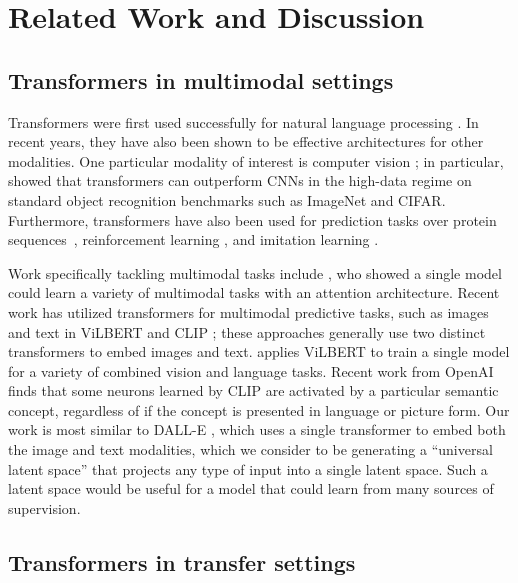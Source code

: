 
\section{Related Work and Discussion}
\label{sec:relatedwork}

\subsection{Transformers in multimodal settings}

Transformers \citep{vaswani2017attention} were first used successfully for natural language processing \citep{radford2018gpt, devlin2019bert, radford2019gpt2, brown2020gpt3}.
In recent years, they have also been shown to be effective architectures for other modalities.
One particular modality of interest is computer vision \citep{chen2020imagegpt, touvron2020deit}; in particular, \cite{dosovitskiy2020vit} showed that transformers can outperform CNNs in the high-data regime on standard object recognition benchmarks such as ImageNet and CIFAR.
Furthermore, transformers have also been used for prediction tasks over protein sequences~\citep{jumper2021alphafold, rao2021msa}, reinforcement learning \citep{parisotto2020stabilizing}, and imitation learning \citep{abramson2020imitating}.

Work specifically tackling multimodal tasks include \cite{kaiser2017multitask}, who showed a single model could learn a variety of multimodal tasks with an attention architecture.
Recent work has utilized transformers for multimodal predictive tasks, such as images and text in ViLBERT \citep{lu2019vilbert} and CLIP \citep{radford2021clip}; these approaches generally use two distinct transformers to embed images and text.
\cite{lu2020vilbertmulti} applies ViLBERT to train a single model for a variety of combined vision and language tasks.
Recent work from OpenAI \citep{goh2021multimodal} finds that some neurons learned by CLIP are activated by a particular semantic concept, regardless of if the concept is presented in language or picture form.
Our work is most similar to DALL-E \citep{ramesh2021dalle}, which uses a single transformer to embed both the image and text modalities, which we consider to be generating a ``universal latent space'' that projects any type of input into a single latent space.
Such a latent space would be useful for a model that could learn from many sources of supervision.

\subsection{Transformers in transfer settings}

